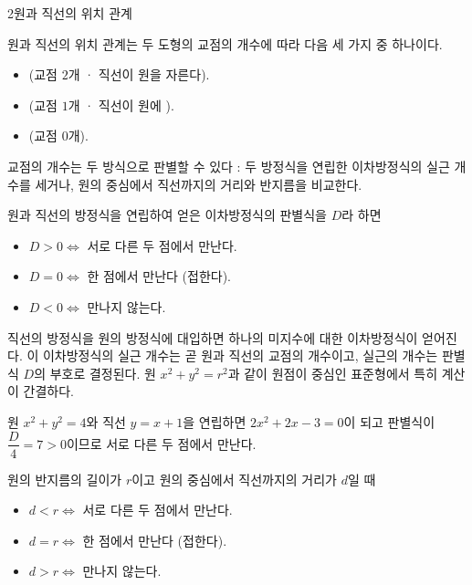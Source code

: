 \documentclass[10pt]{article}
\begin{document}
\begin{dmconcept}{2}{원과 직선의 위치 관계}
\setlength{\parskip}{1.2mm plus 1.3mm minus 0mm}\linespread{1.19}\selectfont%


원과 직선의 위치 관계는 두 도형의 교점의 개수에 따라 다음 세 가지 중 하나이다.
\begin{itemize}[leftmargin=8mm, itemsep=0.5mm, topsep=1mm]
  \item {} (교점 $2$개 · 직선이 원을 자른다).
  \item {} (교점 $1$개 · 직선이 원에 ).
  \item {} (교점 $0$개).
\end{itemize}
교점의 개수는 두 방식으로 판별할 수 있다 : 두 방정식을 연립한 이차방정식의 실근 개수를 세거나, 원의 중심에서 직선까지의 거리와 반지름을 비교한다.


원과 직선의 방정식을 연립하여 얻은 이차방정식의 판별식을 $D$라 하면
\begin{itemize}[leftmargin=8mm, itemsep=0.5mm, topsep=1mm]
  \item $D > 0 \Longleftrightarrow$ 서로 다른 두 점에서 만난다.
  \item $D = 0 \Longleftrightarrow$ 한 점에서 만난다 (접한다).
  \item $D < 0 \Longleftrightarrow$ 만나지 않는다.
\end{itemize}

\begin{dmexplain}
직선의 방정식을 원의 방정식에 대입하면 하나의 미지수에 대한 이차방정식이 얻어진다. 이 이차방정식의 실근 개수는 곧 원과 직선의 교점의 개수이고, 실근의 개수는 판별식 $D$의 부호로 결정된다. 원 $x^2 + y^2 = r^2$과 같이 원점이 중심인 표준형에서 특히 계산이 간결하다.
\end{dmexplain}

\begin{dmexample}
원 $x^2 + y^2 = 4$와 직선 $y = x + 1$을 연립하면 $2x^2 + 2x - 3 = 0$이 되고 판별식이 $\dfrac{D}{4} = 7 > 0$이므로 서로 다른 두 점에서 만난다.
\end{dmexample}


원의 반지름의 길이가 $r$이고 원의 중심에서 직선까지의 거리가 $d$일 때
\begin{itemize}[leftmargin=8mm, itemsep=0.5mm, topsep=1mm]
  \item $d < r \Longleftrightarrow$ 서로 다른 두 점에서 만난다.
  \item $d = r \Longleftrightarrow$ 한 점에서 만난다 (접한다).
  \item $d > r \Longleftrightarrow$ 만나지 않는다.
\end{itemize}


\end{dmconcept}
\end{document}
